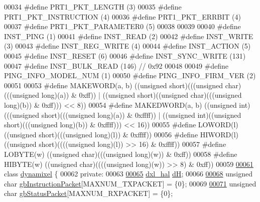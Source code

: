 \begin{DoxyCode}
00034 \textcolor{preprocessor}{#define PRT1\_PKT\_LENGTH             (3)}
00035 \textcolor{preprocessor}{#define PRT1\_PKT\_INSTRUCTION        (4)}
00036 \textcolor{preprocessor}{#define PRT1\_PKT\_ERRBIT             (4)}
00037 \textcolor{preprocessor}{#define PRT1\_PKT\_PARAMETER0         (5)}
00038 
00039 
00040 \textcolor{preprocessor}{#define INST\_PING           (1)}
00041 \textcolor{preprocessor}{#define INST\_READ           (2)}
00042 \textcolor{preprocessor}{#define INST\_WRITE          (3)}
00043 \textcolor{preprocessor}{#define INST\_REG\_WRITE      (4)}
00044 \textcolor{preprocessor}{#define INST\_ACTION         (5)}
00045 \textcolor{preprocessor}{#define INST\_RESET          (6)}
00046 \textcolor{preprocessor}{#define INST\_SYNC\_WRITE     (131)}
00047 \textcolor{preprocessor}{#define INST\_BULK\_READ      (146)  // 0x92}
00048 
00049 \textcolor{preprocessor}{#define PING\_INFO\_MODEL\_NUM   (1)}
00050 \textcolor{preprocessor}{#define PING\_INFO\_FIRM\_VER    (2)}
00051     
00053 \textcolor{preprocessor}{#define MAKEWORD(a, b)      ((unsigned short)(((unsigned char)(((unsigned long)(a)) & 0xff)) | ((unsigned
       short)((unsigned char)(((unsigned long)(b)) & 0xff))) << 8))}
00054 \textcolor{preprocessor}{#define MAKEDWORD(a, b)     ((unsigned int)(((unsigned short)(((unsigned long)(a)) & 0xffff)) | ((unsigned
       int)((unsigned short)(((unsigned long)(b)) & 0xffff))) << 16))}
00055 \textcolor{preprocessor}{#define LOWORD(l)           ((unsigned short)(((unsigned long)(l)) & 0xffff))}
00056 \textcolor{preprocessor}{#define HIWORD(l)           ((unsigned short)((((unsigned long)(l)) >> 16) & 0xffff))}
00057 \textcolor{preprocessor}{#define LOBYTE(w)           ((unsigned char)(((unsigned long)(w)) & 0xff))}
00058 \textcolor{preprocessor}{#define HIBYTE(w)           ((unsigned char)((((unsigned long)(w)) >> 8) & 0xff))}
00059 
\hypertarget{dynamixel_8h_source_l00061}{}\hyperlink{classdynamixel}{00061} \textcolor{keyword}{class }\hyperlink{classdynamixel}{dynamixel} \{
00062 \textcolor{keyword}{private}:
00063     
\hypertarget{dynamixel_8h_source_l00065}{}\hyperlink{classdynamixel_ae003cc90ada6d7b70eaa4ea9d42d4deb}{00065}     \hyperlink{classdxl__hal}{dxl\_hal} \hyperlink{classdynamixel_ae003cc90ada6d7b70eaa4ea9d42d4deb}{dH};
00066     
\hypertarget{dynamixel_8h_source_l00068}{}\hyperlink{classdynamixel_afd94dcf01b8e96298727776e222de722}{00068}     \textcolor{keywordtype}{unsigned} \textcolor{keywordtype}{char} \hyperlink{classdynamixel_afd94dcf01b8e96298727776e222de722}{gbInstructionPacket}[MAXNUM\_TXPACKET] = \{0\};
00069     
\hypertarget{dynamixel_8h_source_l00071}{}\hyperlink{classdynamixel_aa57c86d3bbbeaf5c9d4f6bd00376b04f}{00071}     \textcolor{keywordtype}{unsigned} \textcolor{keywordtype}{char} \hyperlink{classdynamixel_aa57c86d3bbbeaf5c9d4f6bd00376b04f}{gbStatusPacket}[MAXNUM\_RXPACKET] = \{0\};

\end{DoxyCode}
